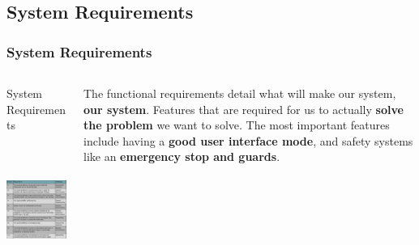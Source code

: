 \documentclass[aspectratio=169]{beamer}
\begin{document}
\subsection{System Requirements}
\begin{frame}
    \frametitle{System Requirements}

    \begin{columns}
        \begin{column}{0.48\textwidth}
            \begin{block}{System Requirements}
                \includegraphics[height=5cm]{FunctionalRequirements}
            \end{block}
        \end{column}

        \begin{column}{0.48\textwidth}
            The functional requirements detail what will make our system, \textbf{our system}. Features
            that are required for us to actually \textbf{solve the problem} we want to solve.
            The most important features include having a \textbf{good user interface mode}, and safety
            systems like an \textbf{emergency stop and guards}.
        \end{column}
    \end{columns}


\end{frame}
\end{document}
